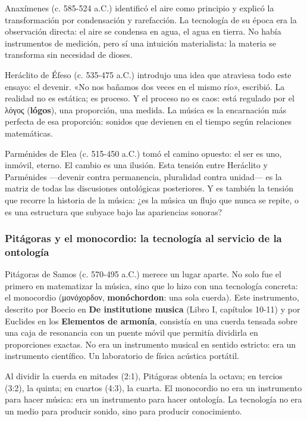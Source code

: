 \documentclass[14pt, a4paper]{article}
\begin{document}
Anaxímenes (c. 585-524 a.C.) identificó el aire como principio y
explicó la transformación por condensación y rarefacción. La
tecnología de su época era la observación directa: el aire se
condensa en agua, el agua en tierra. No había instrumentos de
medición, pero sí una intuición materialista: la materia se transforma
sin necesidad de dioses.

Heráclito de Éfeso (c. 535-475 a.C.) introdujo una idea que atraviesa
todo este ensayo: el devenir. «No nos bañamos dos veces en el mismo
río», escribió. La realidad no es estática; es proceso. Y el proceso
no es caos: está regulado por el λόγος (\textbf{lógos}), una proporción, una
medida. La música es la encarnación más perfecta de esa proporción:
sonidos que devienen en el tiempo según relaciones matemáticas.

Parménides de Elea (c. 515-450 a.C.) tomó el camino opuesto: el ser
es uno, inmóvil, eterno. El cambio es una ilusión. Esta tensión entre
Heráclito y Parménides —devenir contra permanencia, pluralidad contra
unidad— es la matriz de todas las discusiones ontológicas posteriores.
Y es también la tensión que recorre la historia de la música: ¿es la
música un flujo que nunca se repite, o es una estructura que subyace
bajo las apariencias sonoras?
\subsubsection{Pitágoras y el monocordio: la tecnología al servicio de la ontología}
\label{pitagoras-antecedentes}
Pitágoras de Samos (c. 570-495 a.C.) merece un lugar aparte. No solo
fue el primero en matematizar la música, sino que lo hizo con una
tecnología concreta: el monocordio (μονόχορδον, \textbf{monóchordon}: una
sola cuerda). Este instrumento, descrito por Boecio en \textbf{De
institutione musica} (Libro I, capítulos 10-11) y por Euclides en los
\textbf{Elementos de armonía}, consistía en una cuerda tensada sobre una caja
de resonancia con un puente móvil que permitía dividirla en
proporciones exactas. No era un instrumento musical en sentido
estricto: era un instrumento científico. Un laboratorio de física
acústica portátil.

Al dividir la cuerda en mitades (2:1), Pitágoras obtenía la octava; en
tercios (3:2), la quinta; en cuartos (4:3), la cuarta. El monocordio
no era un instrumento para hacer música: era un instrumento para hacer
ontología. La tecnología no era un medio para producir sonido, sino
para producir conocimiento.
\end{document}
